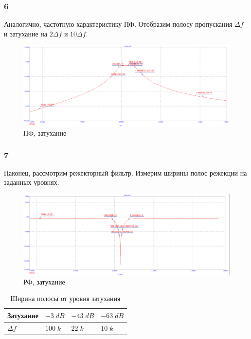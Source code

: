 \documentclass[12pt,a4paper]{article}
\begin{document}
	\subsubsection*{6}

	Аналогично, частотную характеристику ПФ. Отобразим полосу пропускания $\Delta f$ и затухание на $2\Delta f$ и $10 \Delta f$.

	\begin{figure}[H]
		\centering
		\includegraphics[width=1.0\linewidth]{res/imp3p_bandpass_log.png}
		\caption{ПФ, затухание}
		\label{phase}
	\end{figure}

	\subsubsection*{7}
	
	Наконец, рассмотрим режекторный фильтр. Измерим ширины полос режекции на заданных уровнях.
	\begin{figure}[H]
		\centering
		\includegraphics[width=1.0\linewidth]{res/imp3p_reject_log.png}
		\caption{РФ, затухание}
		\label{phase}
	\end{figure}

	\begin{table}[H]
		\begin{tabular}{llll}
			\hline
			Затухание  & $-3 \; dB$ & $-43 \; dB$ & $-63 \; dB$ \\ \hline
			$\Delta f$ & $100 \; k$ & $22 \; k$   & $10 \; k$   \\ \hline
		\end{tabular}
		\caption{Ширина полосы от уровня затухания}
	\end{table}	
		
\end{document}
